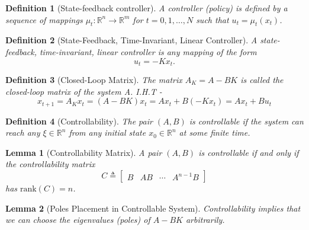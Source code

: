 \documentclass[a4 paper]{article}
\numberwithin{equation}{section}
\theoremstyle{boldStyle}
\theoremstyle{boldBlueStyle}
\newtheorem{lemma}{Lemma}[section]
\theoremstyle{boldPurpleStyle}
\theoremstyle{boldRedStyle}
\newtheorem{definition}{Definition}[section]
\theoremstyle{boldGreenStyle}
\begin{document}
\begin{definition}[State-feedback controller]
  A controller (policy) is defined by a sequence of mappings \( \mu_t : \mathbb{R}^n \to \mathbb{R}^m \) 
  for \( t = 0, 1, \ldots, N \) such that \( u_t = \mu_t(x_t) \).  
\end{definition}
  

\begin{definition}[State-Feedback, Time-Invariant, Linear Controller]
A state-feedback, time-invariant, linear controller is any mapping of the form
\[
u_t = -K x_t.
\]
\end{definition}

\begin{definition}[Closed-Loop Matrix]
  The matrix $A_K = A - BK$ is called the closed-loop matrix of the system A. I.H.T -
  \[
    x_{t+1} = A_Kx_t = (A - BK)x_t = Ax_t + B(-Kx_t) = Ax_t + Bu_t
  \]
\end{definition}


\begin{definition}[Controllability]
  The pair \( (A, B) \) is \textit{controllable} if the system can reach any \( \xi \in \mathbb{R}^n \) from any initial state \( x_0 \in \mathbb{R}^n \) at some finite time.
\end{definition}

\begin{lemma}[Controllability Matrix]
  A pair \( (A, B) \) is controllable if and only if the \textit{controllability matrix}
  \[
  C \triangleq \begin{bmatrix} B & AB & \cdots & A^{n-1}B \end{bmatrix}
  \]
  has \( \text{rank}(C) = n \).
\end{lemma}


\begin{lemma}[Poles Placement in Controllable System]
  Controllability implies that we can choose the eigenvalues (poles) of \( A - BK \) arbitrarily.
\end{lemma}





\newpage
\end{document}
